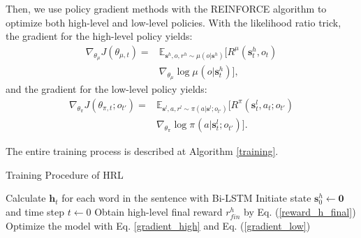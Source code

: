 \documentclass[letterpaper]{article}
\theoremstyle{definition}
\begin{document}
Then, we use policy gradient methods \cite{sutton2000policy} with the REINFORCE algorithm \cite{williams1992simple} to optimize both high-level and low-level policies.
With the likelihood ratio trick, the gradient for the high-level policy yields:
\begin{equation}\label{gradient_high}
    \begin{split}
        \nabla_{\theta_{\mu}} J(\theta_{{\mu},t}) =& \mathbb{E}_{\mathbf{s}^h,o,r^h \sim \mu(o|\mathbf{s}^h)} [R^\mu(\mathbf{s}_t^h, o_t) \\ & \nabla_{\theta_{\mu}} \log \mu_{}(o|\mathbf{s}_t^h)],
    \end{split}
\end{equation}
and the gradient for the low-level policy yields: %
\begin{equation}\label{gradient_low}
    \begin{split}
         \nabla_{\theta_{\pi}} J(\theta_{\pi,t};o_{t'}) =& \mathbb{E}_{\mathbf{s}^l,a,r^l \sim \pi(a|\mathbf{s}^l;o_{t'})} [R^\pi(\mathbf{s}_t^l, a_t; o_{t'}) \\ & \nabla_{\theta_{\pi}} \log \pi_{}(a|\mathbf{s}_t^l; o_{t'})].
    \end{split}
\end{equation}


The entire training process is described at Algorithm \ref{training}.

\begin{algorithm}[!htb]
\small
\caption{Training Procedure of HRL}
\label{training}
Calculate $\mathbf{h}_t$ for each word in the sentence with Bi-LSTM \;
Initiate state $\mathbf{s}_0^h \leftarrow \mathbf{0}$ and time step $t \leftarrow 0$\;
Obtain high-level final reward $r_{fin}^h$ by Eq. (\ref{reward_h_final})\;
Optimize the model with Eq. \ref{gradient_high} and Eq. (\ref{gradient_low})\;
\end{algorithm}
\end{document}
